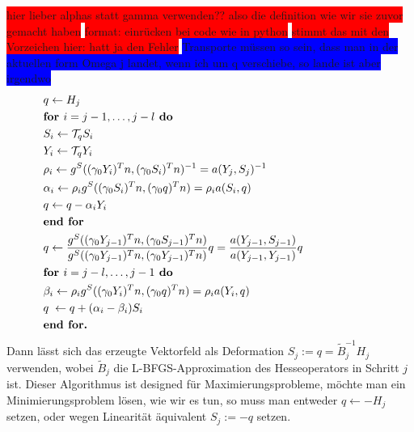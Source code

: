 \begin{defi}
\colorbox{red}{hier lieber alphas statt gamma verwenden?? also die definition wie wir sie zuvor gemacht haben}
\colorbox{red}{format: einrücken bei code wie in python}
\colorbox{red}{stimmt das mit den Vorzeichen hier: hatt ja den Fehler}
\colorbox{blue}{Transporte müssen so sein, dass man in der aktuellen form Omega j landet, wenn ich um q verschiebe, so lande ist aber irgendwo}
\begin{equation} 
\label{2loopbfgs}
\begin{aligned}
&	\hspace{-2.3cm}	q \leftarrow H_j \\
&	\hspace{-2.3cm} \textbf{for } i = j - 1, \dots, j - l \textbf{ do} \\
&	\hspace{-2.3cm} 	S_i \leftarrow \mathcal{T}_q S_i \\
&	\hspace{-2.3cm} 	Y_i \leftarrow \mathcal{T}_q Y_i \\
&	\hspace{-2.3cm} 	\rho_i \leftarrow g^S((\gamma_0 Y_i)^Tn, (\gamma_0 S_i)^Tn)^{-1} = a(Y_j, S_j)^{-1} \\
&	\hspace{-2.3cm} 	\alpha_i \leftarrow \rho_i g^S((\gamma_0 S_i)^Tn, (\gamma_0 q)^T n) = \rho_i a(S_i, q) \\
&	\hspace{-2.3cm}		q \leftarrow q - \alpha_i Y_i \\
&	\hspace{-2.3cm}     \textbf{end for} \\
&	\hspace{-2.3cm}     q \leftarrow \frac{g^S((\gamma_0 Y_{j-1})^Tn, (\gamma_0 S_{j-1})^Tn)}{g^S((\gamma_0 Y_{j-1})^Tn, (\gamma_0 Y_{j-1})^Tn)}q = \frac{a(Y_{j-1}, S_{j-1})}{a(Y_{j-1}, Y_{j-1})}q \\	
&	\hspace{-2.3cm}     \textbf{for } i = j - l, \dots, j - 1 \textbf{ do} \\
&	\hspace{-2.3cm}   	\beta_i \leftarrow \rho_i g^S((\gamma_0 Y_i)^Tn, (\gamma_0 q)^Tn) = \rho_i a(Y_i, q) \\
&	\hspace{-2.3cm}   	q \;\leftarrow q + (\alpha_i - \beta_i)S_i \\
&	\hspace{-2.3cm}  	\textbf{end for.}
\end{aligned}
\end{equation}
	Dann lässt sich das erzeugte Vektorfeld als Deformation $S_j := q = \tilde{B}_j^{-1}H_j$ verwenden, wobei $\tilde{B}_j$ die L-BFGS-Approximation des Hesseoperators in Schritt $j$ ist. Dieser Algorithmus ist designed für Maximierungsprobleme, möchte man ein Minimierungsproblem lösen, wie wir es tun, so muss man entweder $q \leftarrow -H_j$ setzen, oder wegen Linearität äquivalent \newline $S_j := -q$ setzen.
\end{defi}

